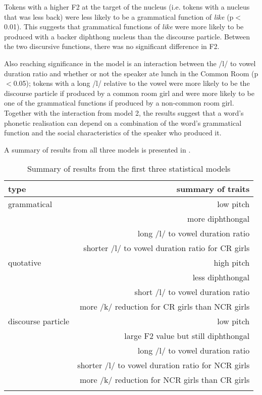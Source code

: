 Tokens with a higher F2 at the target of the nucleus (i.e. tokens with a nucleus that was less back) were less likely to be a grammatical function of \textit{like} (p$<$0.01). This suggests that grammatical functions of \textit{like} were more likely to be produced with a backer diphthong nucleus than the discourse particle. Between the two discursive functions, there was no significant difference in F2.

Also reaching significance in the model is an interaction between the /l/ to vowel duration ratio and whether or not the speaker ate lunch in the Common Room (p$<$0.05); tokens with a long /l/ relative to the vowel were more likely to be the discourse particle if produced by a common room girl and were more likely to be one of the grammatical functions if produced by a non-common room girl. Together with the interaction from model 2, the results suggest that a word's phonetic realisation can depend on a combination of the word's grammatical function and the social characteristics of the speaker who produced it.


A summary of results from all three models is presented in .

  
\begin{table}
\begin{center}
\begin{tabular}{lr}
  \lsptoprule
 type & summary of traits \\
 \midrule
 
 grammatical & low pitch   \\
             & more diphthongal \\
             & long /l/ to vowel duration ratio \\
             & shorter /l/ to vowel duration ratio for CR girls \\
             
             \midrule
 quotative   & high pitch \\
             & less diphthongal \\
             & short /l/ to vowel duration ratio \\
             & more /k/ reduction for CR girls than NCR girls \\
             \midrule
             
 discourse particle & low pitch \\
        		 & large F2 value but still diphthongal \\
             & long /l/ to vowel duration ratio \\
             & shorter /l/ to vowel duration ratio for NCR girls \\
             & more /k/ reduction for NCR girls than CR girls \\
  \lspbottomrule

\end{tabular}
\caption{Summary of results from the first three statistical models}
\label{tab:sumprodresults}
\end{center}
\end{table}


